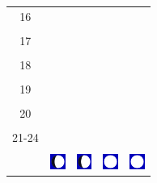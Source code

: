 \documentclass[a4paper,12pt, tikz]{scrartcl}
\begin{document}
\begin{tabularx}{\linewidth}{|c|X|X|p{2cm}|p{2cm}|}
            &   &       &    &   \\
          \hline
          16&   &                 &    &   \\
            &   &       &    &   \\
          \hline
          17&   &                 &    &   \\
            &   &       &    &   \\
          \hline
          18&   &                 &    &   \\
            &   &       &    &   \\
          \hline
          19&   &                 &     &   \\
            &   &       &    &   \\
          \hline
          20&   &              &    &   \\
            &   &       &    &   \\
          \hline 
          21-24&   &              &    &   \\
            &   &       &    &   \\
          \hline
                      & \vspace{0.01cm} \centerline{\includegraphics[width=0.5cm]{moon_phases/Moon_phase_3.svg.png}} \vspace{0.1cm} & \vspace{0.01cm} \centerline{\includegraphics[width=0.5cm]{moon_phases/Moon_phase_3.svg.png}} \vspace{0.1cm} & \vspace{0.01cm} \centerline{\includegraphics[width=0.5cm]{moon_phases/Moon_phase_4.svg.png}} \vspace{0.1cm} & \vspace{0.01cm} \centerline{\includegraphics[width=0.5cm]{moon_phases/Moon_phase_4.svg.png}} \vspace{0.1cm}\\
          \hline    
        \end{tabularx}
\end{document}

